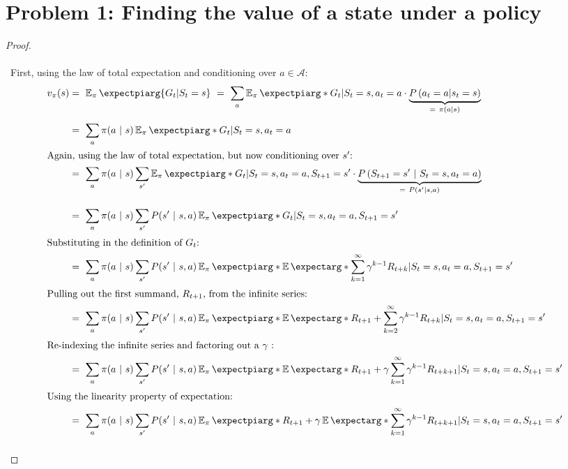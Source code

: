 \documentclass[twoside,11pt]{homework}
\date{\today} %
\DeclarePairedDelimiter{\2norm}{\lVert}{\rVert^2_2}
\newcommand{\1}[1]{\mathds{1}\left[#1\right]}
\newcommand{\expect}{\operatorname{\mathbb{E}}\expectarg}
\newcommand{\expectpi}{\operatorname{\mathbb{E}_{\pi}}\expectpiarg}
\begin{document}
\maketitle

\section*{\large Problem 1: Finding the value of a state under a policy}

\begin{proof}
\text{}\\\ \\\
First, using the law of total expectation and conditioning over $a \in \mathcal{A}$:
\begin{align*} 
v_{\pi}(s) &  = \ \expectpi{G_t  |  S_t = s } \ = \ \sum_{a} \expectpi*{  G_t   |   S_t = s, a_t = a }\cdot \underbrace{P\left(a_t = a | s_t = s\right)}_{ = \ \pi(a  |  s)} \\[0.5em]
& = \ \sum_{a} \pi(a \ | \ s)\expectpi*{  G_t   |   S_t = s, a_t = a } \\
\intertext{Again, using the law of total expectation, but now conditioning over $s'$:}
& = \ \sum_{a} \pi(a \ | \ s)\sum_{s'}\expectpi*{  G_t   |   S_t = s, a_t = a, S_{t+1} = s'} \cdot \underbrace{P\left(S_{t+1} = s' \ | \ S_t = s, a_t = a \right)}_{= \ P(s' | s, a)} \\[1em]
& = \ \sum_{a} \pi(a \ | \ s)\sum_{s'} P(s' \ | \ s, a)\expectpi*{  G_t   |   S_t = s, a_t = a, S_{t+1} = s'}\\[0.2em]
\intertext{Substituting in the definition of $G_t$:} 
& = \ \sum_{a} \pi(a \ | \ s)\sum_{s'} P(s' \ | \ s, a)\expectpi*{  \expect*{\sum_{k=1}^{\infty} \gamma^{k-1}R_{t+k}}   |   S_t = s, a_t = a, S_{t+1} = s'}\\[0.2em]
\intertext{Pulling out the first summand, $R_{t+1}$, from the infinite series:}
& = \ \sum_{a} \pi(a \ | \ s)\sum_{s'} P(s' \ | \ s, a)\expectpi*{  \expect*{R_{t+1} + \sum_{k=2}^{\infty} \gamma^{k-1}R_{t+k}}   |   S_t = s, a_t = a, S_{t+1} = s'}\\[0.2em]
\intertext{Re-indexing the infinite series and factoring out a $\gamma$ :}
& = \ \sum_{a} \pi(a \ | \ s)\sum_{s'} P(s' \ | \ s, a)\expectpi*{  \expect*{R_{t+1} + \gamma\sum_{k=1}^{\infty} \gamma^{k-1}R_{t+k+1}}   |   S_t = s, a_t = a, S_{t+1} = s'}\\[0.2em]
\intertext{Using the linearity property of expectation:}
& = \ \sum_{a} \pi(a \ | \ s)\sum_{s'} P(s' \ | \ s, a)\expectpi*{  R_{t+1} + \gamma\expect*{ \sum_{k=1}^{\infty} \gamma^{k-1}R_{t+k+1}}  |  S_t = s, a_t = a, S_{t+1} = s'}\\[1em]

\end{align*}
\end{proof}
\end{document}
